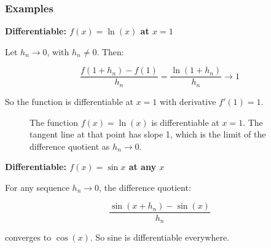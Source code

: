 \subsubsection{Examples}

\textbf{Differentiable: \( f(x) = \ln(x) \) at \( x = 1 \)}  

Let \( h_n \to 0 \), with \( h_n \neq 0 \). Then:

\[
\frac{f(1 + h_n) - f(1)}{h_n} = \frac{\ln(1 + h_n)}{h_n} \to 1
\]

So the function is differentiable at \( x = 1 \) with derivative \( f'(1) = 1 \).

\begin{figure}[H]
\centering
{}
\caption{The function \( f(x) = \ln(x) \) is differentiable at \( x = 1 \). The tangent line at that point has slope 1, which is the limit of the difference quotient as \( h_n \to 0 \).}
\end{figure}










\textbf{Differentiable: \( f(x) = \sin x \) at any \( x \)}  

    For any sequence \( h_n \to 0 \), the difference quotient:

    \[
    \frac{\sin(x + h_n) - \sin(x)}{h_n}
    \]

    converges to \( \cos(x) \). So sine is differentiable everywhere.
    
    






